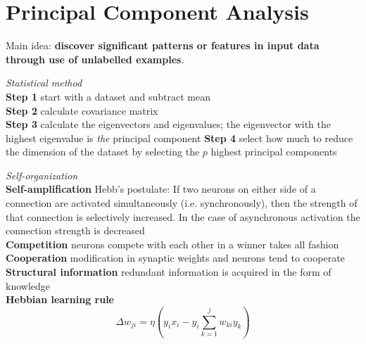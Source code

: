 \documentclass[11pt, twocolumn]{article}
\begin{document}
\section{Principal Component Analysis}
Main idea: \textbf{discover significant patterns or features in input data through use of unlabelled examples}.
\begin{description}
	\item \emph{Statistical method} \\
		\footnotesize
		\textbf{Step 1} start with a dataset and subtract mean\\
		\textbf{Step 2} calculate covariance matrix\\
		\textbf{Step 3} calculate the eigenvectors and eigenvalues; the eigenvector with the highest eigenvalue is \emph{the} principal component
		\textbf{Step 4} select how much to reduce the dimension of the dataset by selecting the $p$ highest principal components
		\normalsize
	\item \emph{Self-organization} \\
		\footnotesize
		\textbf{Self-amplification} Hebb's postulate: If two neurons on either side of a connection are activated simultaneously (i.e. synchronously), then the strength of that connection is selectively increased. In the case of asynchronous activation the connection strength is decreased \\
		\textbf{Competition} neurons compete with each other in a winner takes all fashion \\
		\textbf{Cooperation} modification in synaptic weights and neurons tend to cooperate \\
		\textbf{Structural information} redundant information is acquired in the form of knowledge \\
		\textbf{Hebbian learning rule}
		\normalsize
		$$\Delta w_{ji}=\eta(y_ix_i-y_i\sum_{k=1}^jw_{ki}y_k)$$
\end{description}
\end{document}
